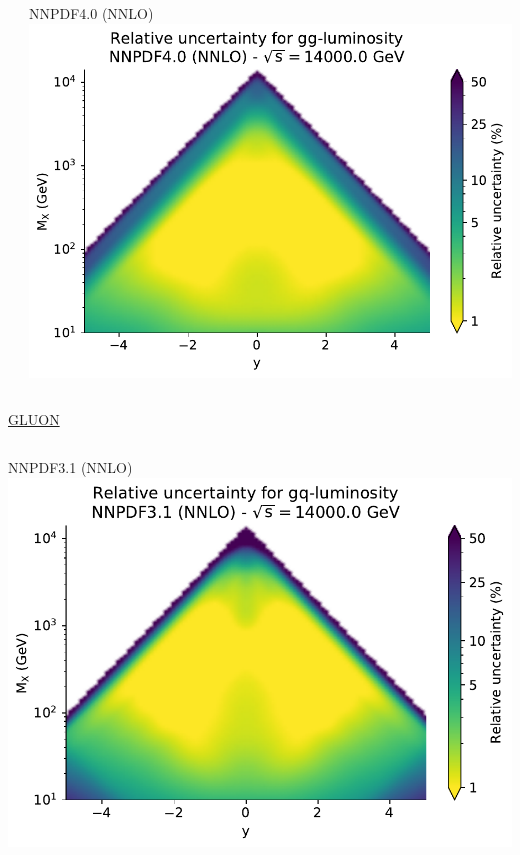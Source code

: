 \documentclass{beamer}
\begin{document}
\begin{frame}
\begin{overlayarea}{\textwidth}{5.2cm}
{\begin{columns}[c]
\begin{column}{0.5\textwidth}
   \end{column}
   \begin{column}{0.5\textwidth}
    \centering
        NNPDF4.0 (NNLO)\\
        \vspace{0.1cm}
        \includegraphics[width=\columnwidth]{plots/plot_lumi2d_uncertainty_NNPDF40_gg}\\    
   \end{column}
  \end{columns}  
  } 
  {
  \centering
  \underline{GLUON}\\
  \begin{columns}[c]
   \begin{column}{0.5\textwidth}
    \centering
        NNPDF3.1 (NNLO)\\
        \vspace{0.1cm}
        \includegraphics[width=\columnwidth]{plots/plot_lumi2d_uncertainty_NNPDF31_gq}\\

\end{column}
\end{columns}}
\end{overlayarea}
\end{frame}
\end{document}
